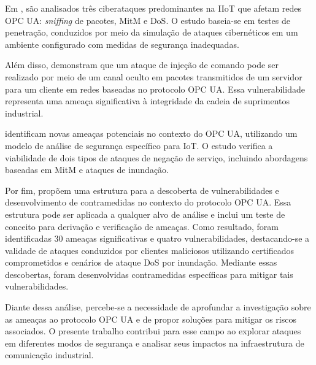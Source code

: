     Em , são analisados três ciberataques predominantes na IIoT que afetam redes OPC UA: \textit{sniffing} de pacotes, MitM e DoS. O estudo baseia-se em testes de penetração, conduzidos por meio da simulação de ataques cibernéticos em um ambiente configurado com medidas de segurança inadequadas.
    
    Além disso,  demonstram que um ataque de injeção de comando pode ser realizado por meio de um canal oculto em pacotes transmitidos de um servidor para um cliente em redes baseadas no protocolo OPC UA. Essa vulnerabilidade representa uma ameaça significativa à integridade da cadeia de suprimentos industrial.
    
     identificam novas ameaças potenciais no contexto do OPC UA, utilizando um modelo de análise de segurança específico para IoT. O estudo verifica a viabilidade de dois tipos de ataques de negação de serviço, incluindo abordagens baseadas em MitM e ataques de inundação.
    
    Por fim,  propõem uma estrutura para a descoberta de vulnerabilidades e desenvolvimento de contramedidas no contexto do protocolo OPC UA. Essa estrutura pode ser aplicada a qualquer alvo de análise e inclui um teste de conceito para derivação e verificação de ameaças. Como resultado, foram identificadas $30$ ameaças significativas e quatro vulnerabilidades, destacando-se a validade de ataques conduzidos por clientes maliciosos utilizando certificados comprometidos e cenários de ataque DoS por inundação. Mediante essas descobertas, foram desenvolvidas contramedidas específicas para mitigar tais vulnerabilidades.
    
    Diante dessa análise, percebe-se a necessidade de aprofundar a investigação sobre as ameaças ao protocolo OPC UA e de propor soluções para mitigar os riscos associados. O presente trabalho contribui para esse campo ao explorar ataques em diferentes modos de segurança e analisar seus impactos na infraestrutura de comunicação industrial.
    